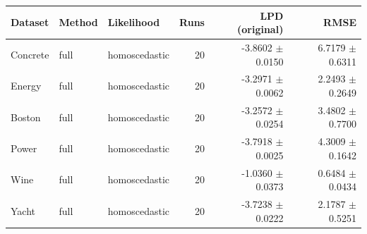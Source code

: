\begin{tabular}{lllrrr}
\toprule
Dataset & Method & Likelihood & Runs & LPD (original) & RMSE \\
\midrule
Concrete & full & homoscedastic & 20 & -3.8602 $\pm$ 0.0150 & 6.7179 $\pm$ 0.6311 \\
Energy & full & homoscedastic & 20 & -3.2971 $\pm$ 0.0062 & 2.2493 $\pm$ 0.2649 \\
Boston & full & homoscedastic & 20 & -3.2572 $\pm$ 0.0254 & 3.4802 $\pm$ 0.7700 \\
Power & full & homoscedastic & 20 & -3.7918 $\pm$ 0.0025 & 4.3009 $\pm$ 0.1642 \\
Wine & full & homoscedastic & 20 & -1.0360 $\pm$ 0.0373 & 0.6484 $\pm$ 0.0434 \\
Yacht & full & homoscedastic & 20 & -3.7238 $\pm$ 0.0222 & 2.1787 $\pm$ 0.5251 \\
\bottomrule
\end{tabular}
